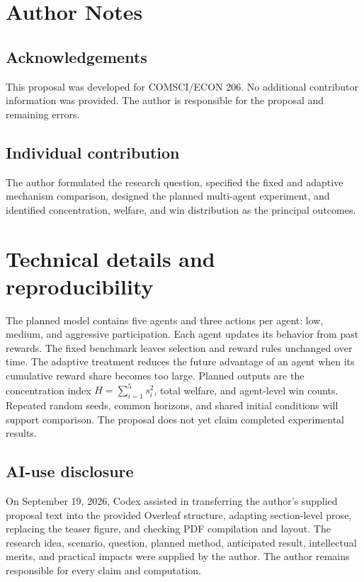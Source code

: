 \clearpage\nobalance
\section*{Author Notes}
\subsection*{Acknowledgements}
This proposal was developed for COMSCI/ECON 206. No additional contributor information was provided. The author is responsible for the proposal and remaining errors.
\subsection*{Individual contribution}
The author formulated the research question, specified the fixed and adaptive mechanism comparison, designed the planned multi-agent experiment, and identified concentration, welfare, and win distribution as the principal outcomes.


\appendix
\section{Technical details and reproducibility}
The planned model contains five agents and three actions per agent: low, medium, and aggressive participation. Each agent updates its behavior from past rewards. The fixed benchmark leaves selection and reward rules unchanged over time. The adaptive treatment reduces the future advantage of an agent when its cumulative reward share becomes too large. Planned outputs are the concentration index $H=\sum_{i=1}^{5}s_i^2$, total welfare, and agent-level win counts. Repeated random seeds, common horizons, and shared initial conditions will support comparison. The proposal does not yet claim completed experimental results.
\subsection{AI-use disclosure}
On September 19, 2026, Codex assisted in transferring the author's supplied proposal text into the provided Overleaf structure, adapting section-level prose, replacing the teaser figure, and checking PDF compilation and layout. The research idea, scenario, question, planned method, anticipated result, intellectual merits, and practical impacts were supplied by the author. The author remains responsible for every claim and computation.

